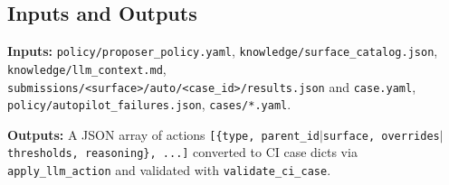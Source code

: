 \subsection{Inputs and Outputs}

\textbf{Inputs:} \texttt{policy/proposer\_policy.yaml}, \texttt{knowledge/surface\_catalog.json}, \texttt{knowledge/llm\_context.md}, \texttt{submissions/<surface>/auto/<case\_id>/results.json} and \texttt{case.yaml}, \texttt{policy/autopilot\_failures.json}, \texttt{cases/*.yaml}.

\textbf{Outputs:} A JSON array of actions \texttt{[\{type, parent\_id$|$surface, overrides$|$thresholds, reasoning\}, ...]} converted to CI case dicts via \texttt{apply\_llm\_action} and validated with \texttt{validate\_ci\_case}.
